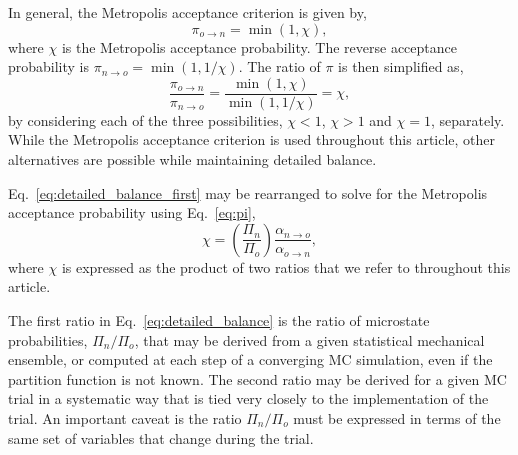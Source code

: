 In general, the Metropolis acceptance criterion is given by,
\begin{equation}
\pi_{o\rightarrow n}=\min(1, \chi),
\end{equation}
where $\chi$ is the Metropolis acceptance probability.
The reverse acceptance probability is $\pi_{n\rightarrow o}=\min(1, 1/\chi)$.
The ratio of $\pi$ is then simplified as,
\begin{equation}
\frac{\pi_{o\rightarrow n}}{\pi_{n\rightarrow o}}=\frac{\min(1, \chi)}{\min(1, 1/\chi)} = \chi,
\label{eq:pi}
\end{equation}
by considering each of the three possibilities, $\chi < 1$, $\chi > 1$ and $\chi=1$, separately.
While the Metropolis acceptance criterion is used throughout this article, other alternatives are possible while maintaining detailed balance.\cite{barker_monte_1965}

Eq.~\ref{eq:detailed_balance_first} may be rearranged to solve for the Metropolis acceptance probability using Eq.~\ref{eq:pi},
\begin{equation}
\chi = \left(\frac{\Pi_n}{\Pi_o}\right)\frac{\alpha_{n\rightarrow o}}{\alpha_{o\rightarrow n}},
\label{eq:detailed_balance}
\end{equation}
where $\chi$ is expressed as the product of two ratios that we refer to throughout this article.

The first ratio in Eq.~\ref{eq:detailed_balance} is the ratio of microstate probabilities, $\Pi_n/\Pi_o$, that may be derived from a given statistical mechanical ensemble, or computed at each step of a converging MC simulation, even if the partition function is not known.
The second ratio may be derived for a given MC trial in a systematic way that is tied very closely to the implementation of the trial.
An important caveat is the ratio $\Pi_n/\Pi_o$ must be expressed in terms of the same set of variables that change during the trial.

